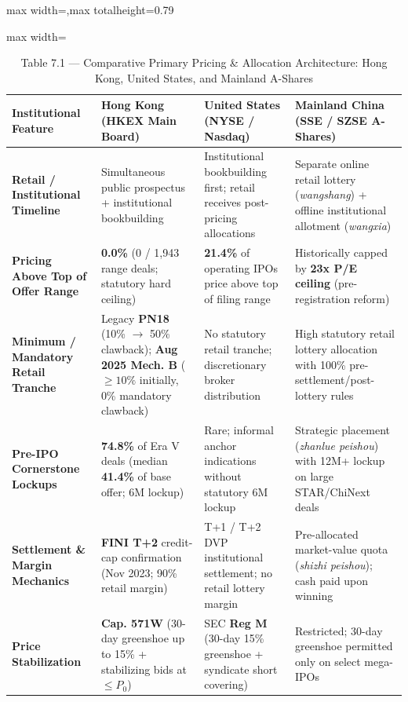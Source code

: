 \documentclass[11pt,letterpaper]{article}
\begin{document}
\begin{table}[!htbp]
\centering
\caption*{Table 7.1 — Comparative Primary Pricing \& Allocation Architecture: Hong Kong, United States, and Mainland A-Shares}
\begin{adjustbox}{max width=\textwidth,max totalheight=0.79\textheight}
\begin{minipage}{\textwidth}\centering
\footnotesize
\setlength{\tabcolsep}{3.5pt}
\renewcommand{\arraystretch}{1.18}
\begin{adjustbox}{max width=\textwidth}
\begin{tabular}{>{\raggedright\arraybackslash}p{2.90cm}>{\raggedright\arraybackslash}p{4.30cm}>{\raggedright\arraybackslash}p{4.30cm}>{\raggedright\arraybackslash}p{4.30cm}}
\toprule
Institutional Feature & Hong Kong (HKEX Main Board) & United States (NYSE / Nasdaq) & Mainland China (SSE / SZSE A-Shares) \\
\midrule
\textbf{Retail / Institutional Timeline} & Simultaneous public prospectus + institutional bookbuilding & Institutional bookbuilding first; retail receives post-pricing allocations & Separate online retail lottery (\textit{wangshang}) + offline institutional allotment (\textit{wangxia}) \\
\textbf{Pricing Above Top of Offer Range} & \textbf{0.0\%} (0 / 1,943 range deals; statutory hard ceiling) & \textbf{21.4\%} of operating IPOs price above top of filing range & Historically capped by \textbf{23x P/E ceiling} (pre-registration reform) \\
\textbf{Minimum / Mandatory Retail Tranche} & Legacy \textbf{PN18} (10\% $\to$ 50\% clawback); \textbf{Aug 2025 Mech. B} ($\ge 10\%$ initially, 0\% mandatory clawback) & No statutory retail tranche; discretionary broker distribution & High statutory retail lottery allocation with 100\% pre-settlement/post-lottery rules \\
\textbf{Pre-IPO Cornerstone Lockups} & \textbf{74.8\%} of Era V deals (median \textbf{41.4\%} of base offer; 6M lockup) & Rare; informal anchor indications without statutory 6M lockup & Strategic placement (\textit{zhanlue peishou}) with 12M+ lockup on large STAR/ChiNext deals \\
\textbf{Settlement \& Margin Mechanics} & \textbf{FINI T+2} credit-cap confirmation (Nov 2023; 90\% retail margin) & T+1 / T+2 DVP institutional settlement; no retail lottery margin & Pre-allocated market-value quota (\textit{shizhi peishou}); cash paid upon winning \\
\textbf{Price Stabilization} & \textbf{Cap. 571W} (30-day greenshoe up to 15\% + stabilizing bids at $\le P_0$) & SEC \textbf{Reg M} (30-day 15\% greenshoe + syndicate short covering) & Restricted; 30-day greenshoe permitted only on select mega-IPOs \\

\end{tabular}
\end{adjustbox}
\end{minipage}
\end{adjustbox}
\end{table}
\end{document}
